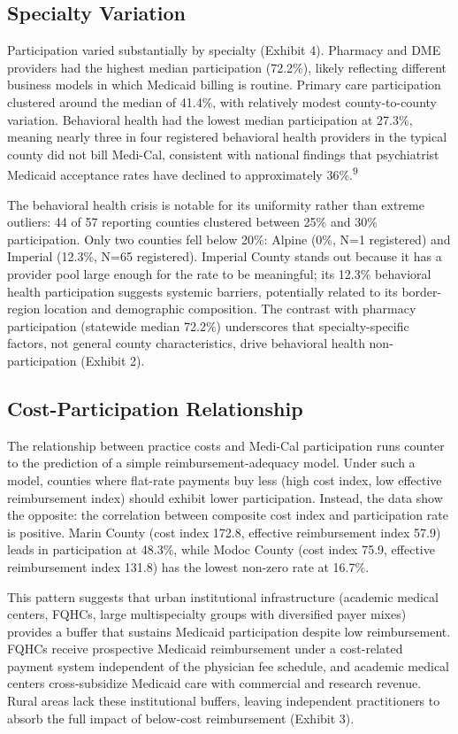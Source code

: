 \documentclass[12pt]{article}
\begin{document}
\subsection{Specialty Variation}

Participation varied substantially by specialty (Exhibit 4). Pharmacy and DME providers had the highest median participation (72.2\%), likely reflecting different business models in which Medicaid billing is routine. Primary care participation clustered around the median of 41.4\%, with relatively modest county-to-county variation. Behavioral health had the lowest median participation at 27.3\%, meaning nearly three in four registered behavioral health providers in the typical county did not bill Medi-Cal, consistent with national findings that psychiatrist Medicaid acceptance rates have declined to approximately 36\%.\textsuperscript{9}

The behavioral health crisis is notable for its uniformity rather than extreme outliers: 44 of 57 reporting counties clustered between 25\% and 30\% participation. Only two counties fell below 20\%: Alpine (0\%, N=1 registered) and Imperial (12.3\%, N=65 registered). Imperial County stands out because it has a provider pool large enough for the rate to be meaningful; its 12.3\% behavioral health participation suggests systemic barriers, potentially related to its border-region location and demographic composition. The contrast with pharmacy participation (statewide median 72.2\%) underscores that specialty-specific factors, not general county characteristics, drive behavioral health non-participation (Exhibit 2).

\subsection{Cost-Participation Relationship}

The relationship between practice costs and Medi-Cal participation runs counter to the prediction of a simple reimbursement-adequacy model. Under such a model, counties where flat-rate payments buy less (high cost index, low effective reimbursement index) should exhibit lower participation. Instead, the data show the opposite: the correlation between composite cost index and participation rate is positive. Marin County (cost index 172.8, effective reimbursement index 57.9) leads in participation at 48.3\%, while Modoc County (cost index 75.9, effective reimbursement index 131.8) has the lowest non-zero rate at 16.7\%.

This pattern suggests that urban institutional infrastructure (academic medical centers, FQHCs, large multispecialty groups with diversified payer mixes) provides a buffer that sustains Medicaid participation despite low reimbursement. FQHCs receive prospective Medicaid reimbursement under a cost-related payment system independent of the physician fee schedule, and academic medical centers cross-subsidize Medicaid care with commercial and research revenue. Rural areas lack these institutional buffers, leaving independent practitioners to absorb the full impact of below-cost reimbursement (Exhibit 3).
\end{document}
